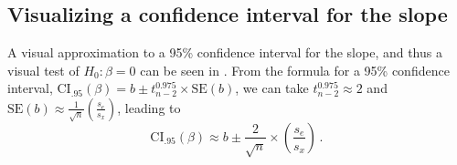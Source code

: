 \subsection{Visualizing a confidence interval for the slope}

A visual approximation to a 95\% confidence interval for the slope, and thus a visual test of $H_0: \beta = 0$
can be seen in .  From the formula for a 95\% confidence interval,
$\mathrm{CI}_{.95} (\beta) = b \pm t_{n-2}^{0.975} \times \mathrm{SE}(b)$, we can take $t_{n-2}^{0.975} \approx 2$
and
$\mathrm{SE}(b) \approx \frac{1}{\sqrt{n}}\left( \frac{s_e}{s_x} \right)$,
leading to
\begin{equation}\label{eq:ci-approx}
\mathrm{CI}_{.95} (\beta) \approx b \pm \frac{2}{\sqrt{n}} \times \left( \frac{s_e}{s_x} \right) \period
\end{equation}
